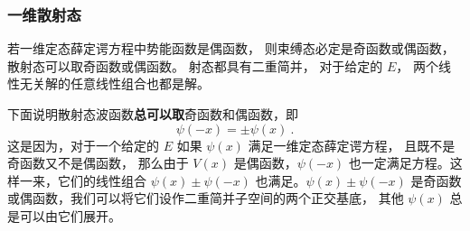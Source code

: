 \subsubsection{一维散射态}
若一维定态薛定谔方程中势能函数是偶函数， 则束缚态必定是奇函数或偶函数， 散射态可以取奇函数或偶函数。 射态都具有二重简并， 对于给定的 $E$， 两个线性无关解的任意线性组合也都是解。

下面说明散射态波函数\textbf{总可以取}奇函数和偶函数，即
\begin{equation}\label{eq_SchEq_3}
\psi(-x) = \pm \psi(x)~.
\end{equation}
这是因为，对于一个给定的 $E$ 如果 $\psi(x)$ 满足一维定态薛定谔方程， 且既不是奇函数又不是偶函数， 那么由于 $V(x)$ 是偶函数，$\psi(-x)$ 也一定满足方程。这样一来，它们的线性组合 $\psi(x)\pm\psi(-x)$ 也满足。$\psi(x)\pm \psi(-x)$ 是奇函数或偶函数，我们可以将它们设作二重简并子空间的两个正交基底， 其他 $\psi(x)$ 总是可以由它们展开。
